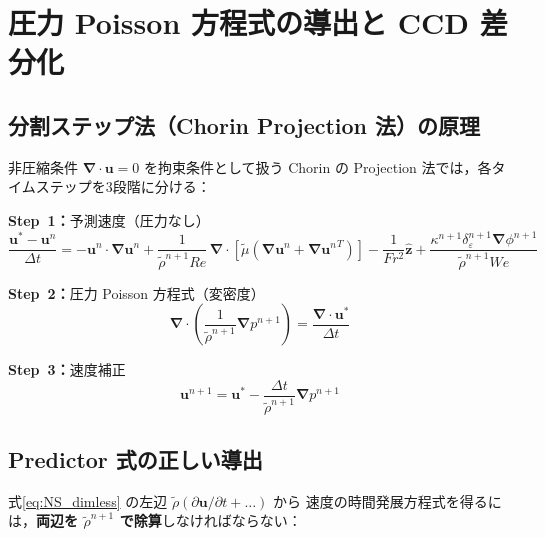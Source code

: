 \documentclass[12pt, a4paper, titlepage]{article}
\newcommand{\jp}[1]{{\normalfont\jpfont #1}}
\newcommand{\bu}{\bm{u}}
\newcommand{\bnabla}{\bm{\nabla}}
\newcommand{\de}{\delta_\varepsilon}
\begin{document}
\section{\jp{圧力 Poisson 方程式の導出と CCD 差分化}}
\label{sec:pressure}

\subsection{\jp{分割ステップ法（Chorin Projection 法）の原理}}

\jp{非圧縮条件 $\bnabla\cdot\bu = 0$ を拘束条件として扱う Chorin \cite{Chorin1968} の
Projection 法では，各タイムステップを3段階に分ける：}

\begin{tcolorbox}[algbox, title={\jp{Projection 法の3段階}}]
\textbf{Step~1\jp{：}}\jp{予測速度（圧力なし）}
\begin{equation}
  \frac{\bu^* - \bu^n}{\Delta t}
  = -\bu^n\cdot\bnabla\bu^n
  + \frac{1}{\tilde{\rho}^{n+1} Re}\,\bnabla\cdot\!\left[\tilde{\mu}\!\left(\bnabla\bu^n + \bnabla{\bu^n}^T\right)\right]
  - \frac{1}{Fr^2}\hat{\bm{z}}
  + \frac{\kappa^{n+1}\de^{n+1}\bnabla\phi^{n+1}}{\tilde{\rho}^{n+1} We}
  \label{eq:predictor}
\end{equation}

\textbf{Step~2\jp{：}}\jp{圧力 Poisson 方程式（変密度）}
\begin{equation}
  \bnabla\cdot\!\left(\frac{1}{\tilde{\rho}^{n+1}}\bnabla p^{n+1}\right)
  = \frac{\bnabla\cdot\bu^*}{\Delta t}
  \label{eq:PPE_operator}
\end{equation}

\textbf{Step~3\jp{：}}\jp{速度補正}
\begin{equation}
  \bu^{n+1} = \bu^* - \frac{\Delta t}{\tilde{\rho}^{n+1}}\bnabla p^{n+1}
  \label{eq:corrector}
\end{equation}
\end{tcolorbox}

\subsection{\jp{Predictor 式の正しい導出}}

\jp{式\eqref{eq:NS_dimless} の左辺 $\tilde\rho(\partial\bu/\partial t + \ldots)$ から
速度の時間発展方程式を得るには，\textbf{両辺を $\tilde\rho^{n+1}$ で除算}しなければならない：}
\end{document}
